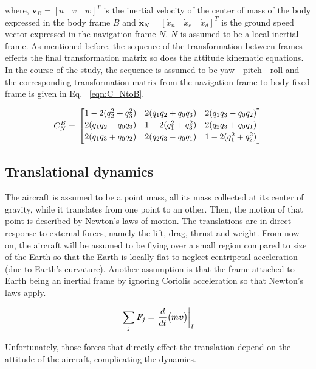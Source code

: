 where, $\bm{v}_B = [u \quad v \quad w]^T$ is the inertial velocity of the center of mass of the body expressed in the body frame $B$ and $\dot{\bm{x}}_N = [\dot{x}_n \quad  \dot{x}_e \quad \dot{x}_d]^T$ is the ground speed vector expressed in the navigation frame $N$. $N$ is assumed to be a local inertial frame.
As mentioned before, the sequence of the transformation between frames effects the final transformation matrix so does the attitude kinematic equations. 
In the course of the study, the sequence is assumed to be yaw - pitch - roll and the corresponding transformation matrix from the navigation frame to body-fixed frame is given in Eq. ~\ref{eqn:C_NtoB}.

\begin{equation}{\label{eqn:C_NtoB}}
C_N^B
= \,
\begin{bmatrix}
1 - 2(q_2^2 + q_3^2) & 2(q_1 q_2 + q_0 q_3) & 2(q_1 q_3 - q_0 q_2)  \\[0.2em]
2(q_1 q_2 - q_0 q_3) & 1 - 2(q_1^2 + q_3^2) & 2(q_2 q_3 + q_0 q_1)\\[0.2em]
2(q_1 q_3 + q_0 q_2) & 2(q_2 q_3 - q_0 q_1) & 1 - 2(q_1^2 + q_2^2) \\[0.2em]
\end{bmatrix}
\end{equation}


\subsection{Translational dynamics}

The aircraft is assumed to be a point mass, all its mass collected at its center of gravity, while it translates from one point to an other.
Then, the motion of that point is described by Newton's laws of motion.
The translations are in direct response to external forces, namely the lift, drag, thrust and weight.
From now on, the aircraft will be assumed to be flying over a small region compared to size of the Earth so that the Earth is locally flat to neglect centripetal acceleration (due to Earth's curvature). 
Another assumption is that the frame attached to Earth being an inertial frame by ignoring Coriolis acceleration so that Newton's laws apply. 

\begin{equation}{\label{eqn:newtonsSecondLaw}}
\sum_j \bm{F}_j = \left. \frac{d}{dt} \big( m \bm{v} \big) \right|_I
\end{equation}

Unfortunately, those forces that directly effect the translation depend on the attitude of the aircraft, complicating the dynamics.

